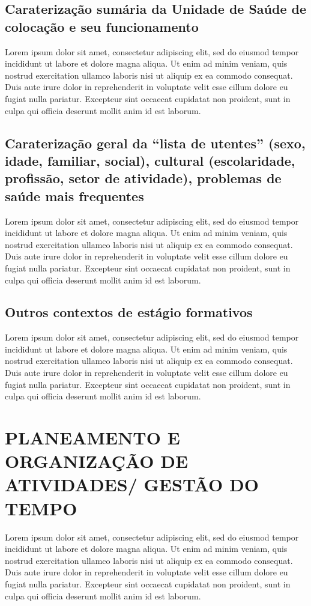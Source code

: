 \documentclass{report}
\begin{document}
\subsection{Caraterização sumária da Unidade de Saúde de colocação e seu funcionamento}
Lorem ipsum dolor sit amet, consectetur adipiscing elit, sed do eiusmod tempor incididunt ut labore et dolore magna aliqua. Ut enim ad minim veniam, quis nostrud exercitation ullamco laboris nisi ut aliquip ex ea commodo consequat. Duis aute irure dolor in reprehenderit in voluptate velit esse cillum dolore eu fugiat nulla pariatur. Excepteur sint occaecat cupidatat non proident, sunt in culpa qui officia deserunt mollit anim id est laborum.
\subsection{Caraterização geral da “lista de utentes” (sexo, idade, familiar, social), cultural (escolaridade, profissão, setor de atividade), problemas de saúde mais frequentes}
Lorem ipsum dolor sit amet, consectetur adipiscing elit, sed do eiusmod tempor incididunt ut labore et dolore magna aliqua. Ut enim ad minim veniam, quis nostrud exercitation ullamco laboris nisi ut aliquip ex ea commodo consequat. Duis aute irure dolor in reprehenderit in voluptate velit esse cillum dolore eu fugiat nulla pariatur. Excepteur sint occaecat cupidatat non proident, sunt in culpa qui officia deserunt mollit anim id est laborum.
\subsection{Outros contextos de estágio formativos}
Lorem ipsum dolor sit amet, consectetur adipiscing elit, sed do eiusmod tempor incididunt ut labore et dolore magna aliqua. Ut enim ad minim veniam, quis nostrud exercitation ullamco laboris nisi ut aliquip ex ea commodo consequat. Duis aute irure dolor in reprehenderit in voluptate velit esse cillum dolore eu fugiat nulla pariatur. Excepteur sint occaecat cupidatat non proident, sunt in culpa qui officia deserunt mollit anim id est laborum.

\section{PLANEAMENTO E ORGANIZAÇÃO DE ATIVIDADES/ GESTÃO DO TEMPO}
Lorem ipsum dolor sit amet, consectetur adipiscing elit, sed do eiusmod tempor incididunt ut labore et dolore magna aliqua. Ut enim ad minim veniam, quis nostrud exercitation ullamco laboris nisi ut aliquip ex ea commodo consequat. Duis aute irure dolor in reprehenderit in voluptate velit esse cillum dolore eu fugiat nulla pariatur. Excepteur sint occaecat cupidatat non proident, sunt in culpa qui officia deserunt mollit anim id est laborum.
\end{document}
